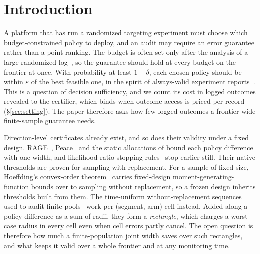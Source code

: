 \documentclass[sigconf,anonymous,review]{acmart}
\newcommand{\eps}{\varepsilon}
\begin{document}

\maketitle

\section{Introduction}\label{sec:intro}

A platform that has run a randomized targeting experiment must choose which budget-constrained policy to deploy, and an audit may require an error guarantee rather than a point ranking. The budget is often set only after the analysis of a large randomized log~\citep{diemert2018large}, so the guarantee should hold at every budget on the frontier at once. With probability at least $1-\delta$, each chosen policy should be within $\eps$ of the best feasible one, in the spirit of always-valid experiment reports~\citep{johari2017peeking,howard2021time}. This is a question of decision sufficiency, and we count its cost in logged outcomes revealed to the certifier, which binds when outcome access is priced per record (\S\ref{sec:setting}). The paper therefore asks how few logged outcomes a frontier-wide finite-sample guarantee needs.

Direction-level certificates already exist, and so does their validity under a fixed design. RAGE~\citep{fiez2019sequential}, Peace~\citep{katzsamuels2020empirical} and the static allocations of \citet{soare2014best} bound each policy difference with one width, and likelihood-ratio stopping rules~\citep{garivier2016optimal,jourdan2021efficient} stop earlier still. Their native thresholds are proven for sampling with replacement. For a sample of fixed size, Hoeffding's convex-order theorem~\citep{hoeffding1963probability} carries fixed-design moment-generating-function bounds over to sampling without replacement, so a frozen design inherits thresholds built from them. The time-uniform without-replacement sequences used to audit finite pools~\citep{waudbysmith2020confidence,waudbysmith2024estimating} work per (segment, arm) cell instead. Added along a policy difference as a sum of radii, they form a \emph{rectangle}, which charges a worst-case radius in every cell even when cell errors partly cancel. The open question is therefore how much a finite-population joint width saves over such rectangles, and what keeps it valid over a whole frontier and at any monitoring time.
\end{document}
